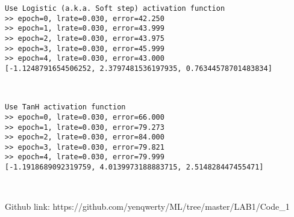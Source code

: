 \documentclass[11pt]{article}
\begin{document}
    \begin{Verbatim}[commandchars=\\\{\}]
Use Logistic (a.k.a. Soft step) activation function
>> epoch=0, lrate=0.030, error=42.250
>> epoch=1, lrate=0.030, error=43.999
>> epoch=2, lrate=0.030, error=43.975
>> epoch=3, lrate=0.030, error=45.999
>> epoch=4, lrate=0.030, error=43.000
[-1.1248791654506252, 2.3797481536197935, 0.76344578701483834]

    \end{Verbatim}

    \begin{center}
    \end{center}
    { \hspace*{\fill} \\}
    
    \begin{Verbatim}[commandchars=\\\{\}]
Use TanH activation function
>> epoch=0, lrate=0.030, error=66.000
>> epoch=1, lrate=0.030, error=79.273
>> epoch=2, lrate=0.030, error=84.000
>> epoch=3, lrate=0.030, error=79.821
>> epoch=4, lrate=0.030, error=79.999
[-1.1918689092319759, 4.0139973188883715, 2.514828447455471]

    \end{Verbatim}

    \begin{center}
    \end{center}
    { \hspace*{\fill} \\}
    
    Github link: https://github.com/yenqwerty/ML/tree/master/LAB1/Code\_1


    
    
    
    
\end{document}
